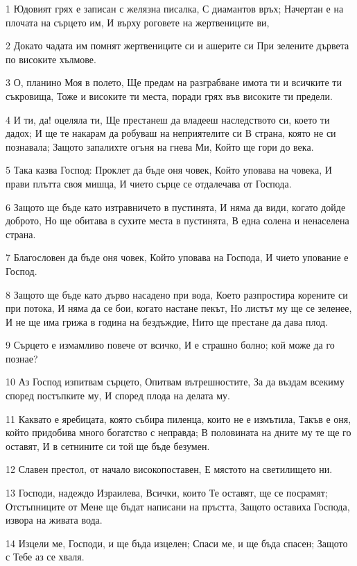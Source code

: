 \par 1 Юдовият грях е записан с желязна писалка, С диамантов връх; Начертан е на плочата на сърцето им, И върху роговете на жертвениците ви,
\par 2 Докато чадата им помнят жертвениците си и ашерите си При зелените дървета по високите хълмове.
\par 3 О, планино Моя в полето, Ще предам на разграбване имота ти и всичките ти съкровища, Тоже и високите ти места, поради грях във високите ти предели.
\par 4 И ти, да! оцеляла ти, Ще престанеш да владееш наследството си, което ти дадох; И ще те накарам да робуваш на неприятелите си В страна, която не си познавала; Защото запалихте огъня на гнева Ми, Който ще гори до века.
\par 5 Така казва Господ: Проклет да бъде оня човек, Който уповава на човека, И прави плътта своя мишца, И чието сърце се отдалечава от Господа.
\par 6 Защото ще бъде като изтравничето в пустинята, И няма да види, когато дойде доброто, Но ще обитава в сухите места в пустинята, В една солена и ненаселена страна.
\par 7 Благословен да бъде оня човек, Който уповава на Господа, И чието упование е Господ.
\par 8 Защото ще бъде като дърво насадено при вода, Което разпростира корените си при потока, И няма да се бои, когато настане пекът, Но листът му ще се зеленее, И не ще има грижа в година на бездъждие, Нито ще престане да дава плод.
\par 9 Сърцето е измамливо повече от всичко, И е страшно болно; кой може да го познае?
\par 10 Аз Господ изпитвам сърцето, Опитвам вътрешностите, За да въздам всекиму според постъпките му, И според плода на делата му.
\par 11 Каквато е яребицата, която събира пиленца, които не е измътила, Такъв е оня, който придобива много богатство с неправда; В половината на дните му те ще го оставят, И в сетнините си той ще бъде безумен.
\par 12 Славен престол, от начало високопоставен, Е мястото на светилището ни.
\par 13 Господи, надеждо Израилева, Всички, които Те оставят, ще се посрамят; Отстъпниците от Мене ще бъдат написани на пръстта, Защото оставиха Господа, извора на живата вода.
\par 14 Изцели ме, Господи, и ще бъда изцелен; Спаси ме, и ще бъда спасен; Защото с Тебе аз се хваля.
